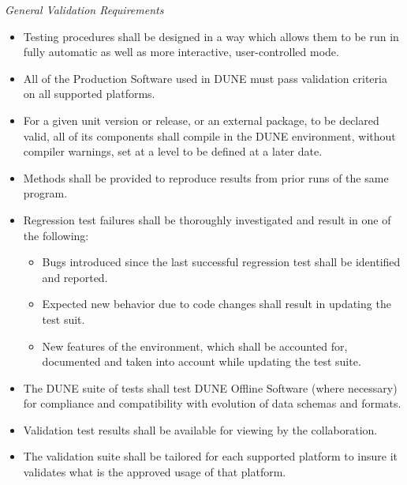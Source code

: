 \textit{General Validation Requirements}
\begin{itemize}
\item Testing procedures shall be designed in a way which allows them to be run in fully automatic as well as more interactive, user-controlled mode.

\item All of the Production Software used in DUNE must pass validation criteria on all supported platforms.

\item For a given unit version or release, or an external package, to be declared valid, all of its components shall compile in the DUNE environment,
without compiler warnings, set at a level to be defined at a later date.


\item Methods shall be provided to reproduce results from prior runs of the same program.


\item Regression test failures shall be thoroughly investigated and result in one of the following:
\begin{itemize}
\item Bugs introduced since the last successful regression test shall be identified and reported.

\item Expected new behavior due to code changes shall result in updating the test suit.

\item New features of the environment, which shall be accounted for, documented and taken into account while updating the test suite.
\end{itemize}

\item The DUNE suite of tests shall test DUNE Offline Software (where necessary) for compliance and compatibility with evolution of data schemas and formats.

\item Validation test results shall be available for viewing by the collaboration.

\item The validation suite shall be tailored for each supported platform to insure it validates what is the approved usage of that platform.

\end{itemize}

